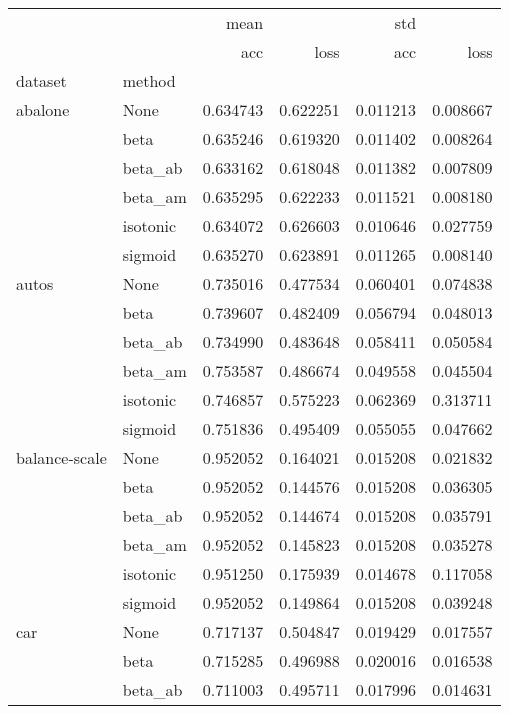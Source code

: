 \begin{tabular}{llrrrr}
\toprule
        &      &      mean &           &       std &           \\
        &      &       acc &      loss &       acc &      loss \\
dataset & method &           &           &           &           \\
\midrule
abalone & None &  0.634743 &  0.622251 &  0.011213 &  0.008667 \\
        & beta &  0.635246 &  0.619320 &  0.011402 &  0.008264 \\
        & beta\_ab &  0.633162 &  0.618048 &  0.011382 &  0.007809 \\
        & beta\_am &  0.635295 &  0.622233 &  0.011521 &  0.008180 \\
        & isotonic &  0.634072 &  0.626603 &  0.010646 &  0.027759 \\
        & sigmoid &  0.635270 &  0.623891 &  0.011265 &  0.008140 \\
autos & None &  0.735016 &  0.477534 &  0.060401 &  0.074838 \\
        & beta &  0.739607 &  0.482409 &  0.056794 &  0.048013 \\
        & beta\_ab &  0.734990 &  0.483648 &  0.058411 &  0.050584 \\
        & beta\_am &  0.753587 &  0.486674 &  0.049558 &  0.045504 \\
        & isotonic &  0.746857 &  0.575223 &  0.062369 &  0.313711 \\
        & sigmoid &  0.751836 &  0.495409 &  0.055055 &  0.047662 \\
balance-scale & None &  0.952052 &  0.164021 &  0.015208 &  0.021832 \\
        & beta &  0.952052 &  0.144576 &  0.015208 &  0.036305 \\
        & beta\_ab &  0.952052 &  0.144674 &  0.015208 &  0.035791 \\
        & beta\_am &  0.952052 &  0.145823 &  0.015208 &  0.035278 \\
        & isotonic &  0.951250 &  0.175939 &  0.014678 &  0.117058 \\
        & sigmoid &  0.952052 &  0.149864 &  0.015208 &  0.039248 \\
car & None &  0.717137 &  0.504847 &  0.019429 &  0.017557 \\
        & beta &  0.715285 &  0.496988 &  0.020016 &  0.016538 \\
        & beta\_ab &  0.711003 &  0.495711 &  0.017996 &  0.014631 \\

\end{tabular}
